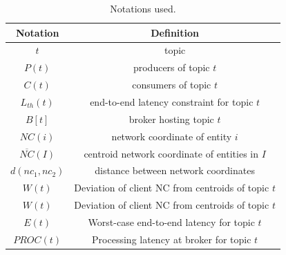 \begin{table}[t]
	\center
	\caption{Notations used.}\label{table:notations}
		\begin{tabular}{ |c|c| } 
			\hline
			\textbf{Notation} & \textbf{Definition}\\ 
			\hline
			$t$ & topic\\
			$P\left( t \right)$ & producers of topic $t$\\
			$C\left( t \right)$ & consumers of topic $t$\\
			$L_{th}\left( t \right)$ & end-to-end latency constraint for topic $t$\\
			$B\left[ t \right]$ & broker hosting topic $t$\\
			$NC\left( i \right)$ & network coordinate of entity $i$\\
			$\overline{NC}\left( I \right)$ & centroid network coordinate of entities in $I$\\
			$d\left( nc_1, nc_2 \right)$ & distance between network coordinates\\
			$W\left( t \right)$ & Deviation of client NC from centroids of topic $t$\\
			$W\left( t \right)$ & Deviation of client NC from centroids of topic $t$\\
			$E\left( t \right)$ & Worst-case end-to-end latency for topic $t$\\
			$PROC \left( t \right)$ & Processing latency at broker for topic $t$\\
			\hline
		\end{tabular}
\end{table}

